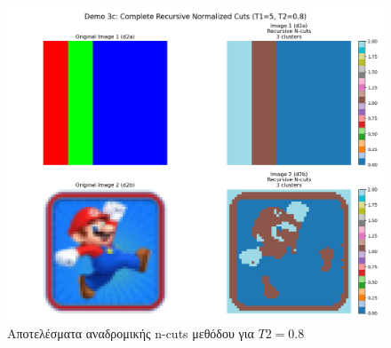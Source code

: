 \documentclass{article}
\begin{document}
\begin{figure}
    \centering
    \includegraphics[width=\linewidth]{Figure_6.png}
    \caption{Αποτελέσματα αναδρομικής n-cuts μεθόδου για $T2=0.8$}\label{figure6}
\end{figure}
\end{document}
